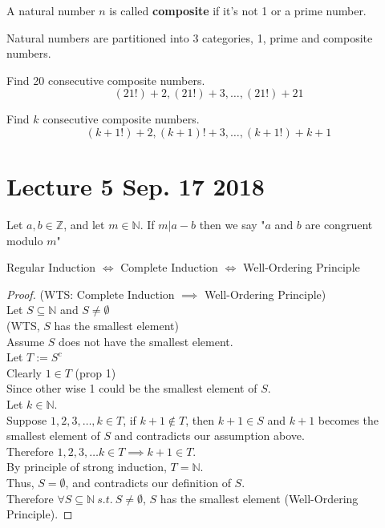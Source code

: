 \documentclass[11pt]{article}
\begin{document}
	\begin{definition}
		A natural number $n$ is called \textbf{composite} if it's not 1 or a prime number.
	\end{definition}
	
	\begin{remark}
		Natural numbers are partitioned into 3 categories, 1, prime and composite numbers.
	\end{remark}
	
	\begin{example}
		Find 20 consecutive composite numbers.
		\[
		(21!)+2, (21!)+3, \dots, (21!)+21
		\]
	\end{example}
	
	\begin{example}
		Find $k$ consecutive composite numbers.
		\[
			(k+1!)+2, (k+1)!+3, \dots ,(k+1!)+k+1
		\]
	\end{example}
	
	\section{Lecture 5 Sep. 17 2018}
	
	\begin{definition}
		Let $a, b \in \mathbb{Z}$, and let $m \in \mathbb{N}$. If $m | a - b$ then we say "$a$ and $b$ are congruent modulo $m$"
	\end{definition}
	
	\begin{remark}
		Regular Induction $\iff$ Complete Induction $\iff$ Well-Ordering Principle
	\end{remark}
	
	\begin{proof}
		(WTS: Complete Induction $\implies$ Well-Ordering Principle) \\
		Let $S \subseteq \mathbb{N}$ and $S \neq \emptyset$ \\
		(WTS, $S$ has the smallest element) \\
		Assume $S$ does not have the smallest element. \\
		Let $T := S^c$ \\
		Clearly $1 \in T$ (prop 1) \\
		Since other wise 1 could be the smallest element of $S$. \\
		Let $k \in \mathbb{N}$. \\
		Suppose $1, 2, 3, \dots, k \in T$, if $k+1 \notin T$, then $k+1 \in S$ and $k+1$ becomes the smallest element of $S$ and contradicts our assumption above. \\
		Therefore $1, 2, 3, \dots k \in T \implies k+1 \in T$.\\ 
		By principle of strong induction, $T = \mathbb{N}$. \\
		Thus, $S = \emptyset$, and contradicts our definition of $S$. \\
		Therefore $\forall S \subseteq \mathbb{N}\ s.t.\ S \neq \emptyset$, $S$ has the smallest element (Well-Ordering Principle). 
	\end{proof}
	
\end{document}
